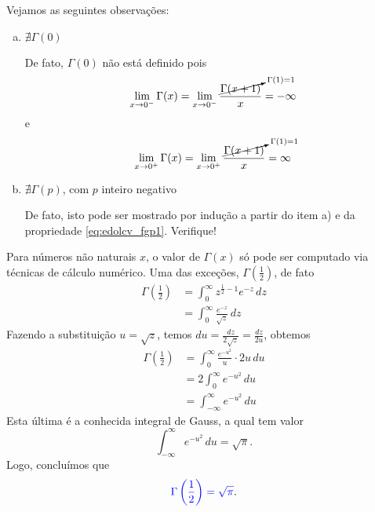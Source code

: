 \begin{obs} Vejamos as seguintes observações:
  \begin{enumerate}[a)]
  \item $\nexists\Gamma(0)$

    De fato, $\Gamma(0)$ não está definido pois
    \begin{equation}
      \lim_{x\to 0^-} \Gamma(x) = \lim_{x\to 0^-} \frac{\cancelto{\Gamma(1)=1}{\Gamma(x+1)}}{x} = -\infty
    \end{equation}
    e
    \begin{equation}
      \lim_{x\to 0^+} \Gamma(x) = \lim_{x\to 0^+} \frac{\cancelto{\Gamma(1)=1}{\Gamma(x+1)}}{x} = \infty
    \end{equation}

  \item $\nexists\Gamma(p)$, com $p$ inteiro negativo

    De fato, isto pode ser mostrado por indução a partir do item a) e da propriedade \eqref{eq:edolcv_fgp1}. Verifique!
  \end{enumerate}
\end{obs}

\begin{obs}
  Para números não naturais $x$, o valor de $\Gamma(x)$ só pode ser computado via técnicas de cálculo numérico. Uma das exceções, $\Gamma(\frac{1}{2})$, de fato
  \begin{align}
    \Gamma\left(\frac{1}{2}\right) &= \int_0^\infty z^{\frac{1}{2}-1}e^{-z}\,dz\\
    &= \int_0^\infty \frac{e^{-z}}{\sqrt{z}}\,dz
  \end{align}
  Fazendo a substituição $u=\sqrt{z}$, temos $\displaystyle du = \frac{dz}{2\sqrt{z}} = \frac{dz}{2u}$, obtemos
  \begin{align}
    \Gamma\left(\frac{1}{2}\right) &= \int_0^\infty \frac{e^{-u^2}}{u}\cdot 2u\,du \\
    &= 2\int_0^\infty e^{-u^2}\,du \\
    &= \int_{-\infty}^\infty e^{-u^2}\,du
  \end{align}
  Esta última é a conhecida integral de Gauss, a qual tem valor
  \begin{equation}
    \int_{-\infty}^\infty e^{-u^2}\,du = \sqrt{\pi}.
  \end{equation}
  Logo, concluímos que
  \begin{equation}\label{eq:edolcv_g12}
    {\color{blue}\Gamma\left(\frac{1}{2}\right) = \sqrt{\pi}}.
  \end{equation}
\end{obs}

